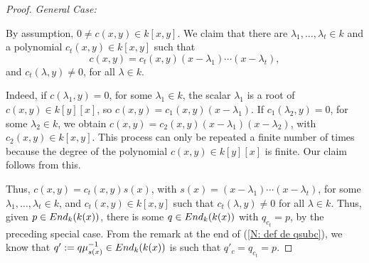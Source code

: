 \documentclass[10pt,a4paper]{amsart}
\newcommand{\End}{{ \rm End }}
\begin{document}
\begin{proof}
\noindent\emph{General Case:} 
\medskip

By assumption, $0\not=c(x,y)\in k[x,y]$. We claim that there are $\lambda_1,\ldots,\lambda_t\in k$ and a polynomial $c_t(x,y)\in k[x,y]$ such that 
$$c(x,y)=c_t(x,y)(x-\lambda_1)\cdots(x-\lambda_t),$$
and $c_t(\lambda,y)\not=0$, for all $\lambda\in k$. 

Indeed, if $c(\lambda_1,y)=0$, for some $\lambda_1\in k$, the scalar $\lambda_1$ is a root of $c(x,y)\in k[y][x]$, so $c(x,y)=c_1(x,y)(x-\lambda_1)$. If $c_1(\lambda_2,y)=0$, for some $\lambda_2\in k$, we obtain $c(x,y)=c_2(x,y)(x-\lambda_1)(x-\lambda_2)$, with $c_2(x,y)\in k[x,y]$. This process can only be repeated a finite number of times because the degree of the polynomial $c(x,y)\in k[y][x]$ is finite. Our claim follows from this. 


Thus, 
  $c(x,y)=c_t(x,y)s(x)$, with $s(x)=(x-\lambda_1)\cdots(x-\lambda_t)$, for some $\lambda_1,\ldots,\lambda_t\in k$, and $c_t(x,y)\in k[x,y]$ such that $c_t(\lambda,y)\not=0$ for all $\lambda\in k$. Thus, given $p\in \End_k(k(x))$, there is some $q\in \End_k(k(x))$ with $q_{c_t}=p$, by the preceding special case. From the remark at the end of (\ref{N: def de qsubc}), we know that $q':=q\mu^{-1}_{s(x)}\in \End_k(k(x))$ is such that $q'_c=q_{c_t}=p$. 
\end{proof}
\end{document}
